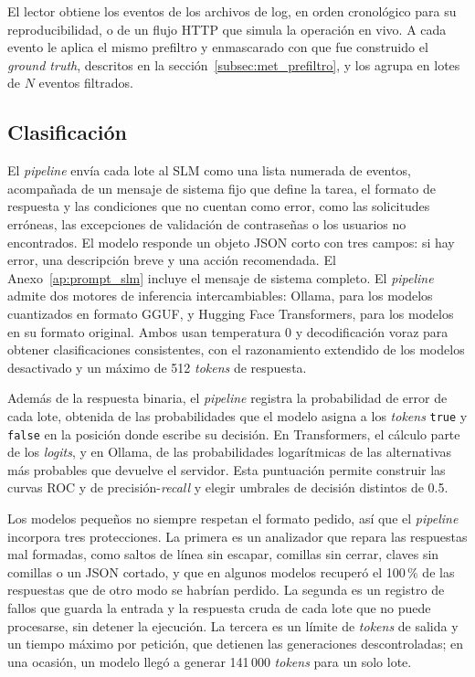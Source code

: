 El lector obtiene los eventos de los archivos de log, en orden cronológico para su reproducibilidad, o de un flujo HTTP que simula la operación en vivo. A cada evento le aplica el mismo prefiltro y enmascarado con que fue construido el \textit{ground truth}, descritos en la sección~\ref{subsec:met_prefiltro}, y los agrupa en lotes de $N$ eventos filtrados.

\subsection{Clasificación}\label{subsec:met_clasificacion}

El \textit{pipeline} envía cada lote al SLM como una lista numerada de eventos, acompañada de un mensaje de sistema fijo que define la tarea, el formato de respuesta y las condiciones que no cuentan como error, como las solicitudes erróneas, las excepciones de validación de contraseñas o los usuarios no encontrados. El modelo responde un objeto JSON corto con tres campos: si hay error, una descripción breve y una acción recomendada. El Anexo~\ref{ap:prompt_slm} incluye el mensaje de sistema completo. El \textit{pipeline} admite dos motores de inferencia intercambiables: Ollama, para los modelos cuantizados en formato GGUF, y Hugging Face Transformers, para los modelos en su formato original. Ambos usan temperatura 0 y decodificación voraz para obtener clasificaciones consistentes, con el razonamiento extendido de los modelos desactivado y un máximo de 512 \textit{tokens} de respuesta.


Además de la respuesta binaria, el \textit{pipeline} registra la probabilidad de error de cada lote, obtenida de las probabilidades que el modelo asigna a los \textit{tokens} \texttt{true} y \texttt{false} en la posición donde escribe su decisión. En Transformers, el cálculo parte de los \textit{logits}, y en Ollama, de las probabilidades logarítmicas de las alternativas más probables que devuelve el servidor. Esta puntuación permite construir las curvas ROC y de precisión-\textit{recall} y elegir umbrales de decisión distintos de 0.5.


Los modelos pequeños no siempre respetan el formato pedido, así que el \textit{pipeline} incorpora tres protecciones. La primera es un analizador que repara las respuestas mal formadas, como saltos de línea sin escapar, comillas sin cerrar, claves sin comillas o un JSON cortado, y que en algunos modelos recuperó el 100\,\% de las respuestas que de otro modo se habrían perdido. La segunda es un registro de fallos que guarda la entrada y la respuesta cruda de cada lote que no puede procesarse, sin detener la ejecución. La tercera es un límite de \textit{tokens} de salida y un tiempo máximo por petición, que detienen las generaciones descontroladas; en una ocasión, un modelo llegó a generar 141\,000 \textit{tokens} para un solo lote.

